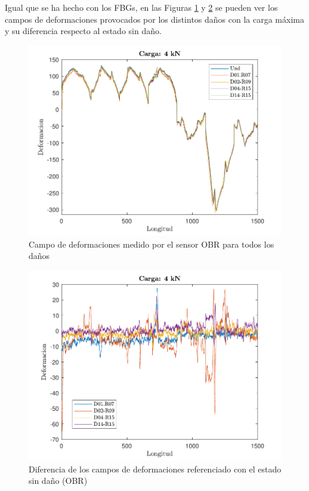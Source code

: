 Igual que se ha hecho con los FBGs, en las Figuras \ref{OBRR_dam} y \ref{OBRR_dif} se pueden ver los campos de deformaciones provocados por los distintos daños con la carga máxima y su diferencia respecto al estado sin daño.

\begin{figure}[h!]
    \centering
    \includegraphics[width=125mm, angle=0]{3/Fotos/OBR_damages.pdf}
    \captionsetup{justification=centering,margin=1.25cm}
    \caption{Campo de deformaciones medido por el sensor OBR para todos los daños}
    \label{OBRR_dam}
\end{figure}
    
\begin{figure}[h!]
    \centering
    \includegraphics[width=125mm, angle=0]{3/Fotos/OBR_dif.pdf}
    \captionsetup{justification=centering,margin=1.25cm}
    \caption{Diferencia de los campos de deformaciones referenciado con el estado sin daño (OBR)}
    \label{OBRR_dif}
\end{figure}
    
